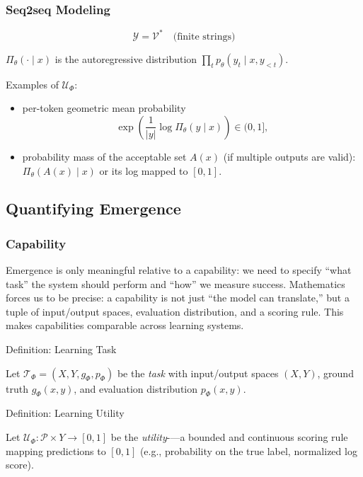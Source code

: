 \documentclass[12pt]{article}
\begin{document}
\subsubsection{Seq2seq Modeling}

\[
\mathcal Y=\mathcal V^{*} \quad \text{(finite strings)}
\]

$\Pi_\theta(\cdot\mid x)$ is the autoregressive distribution $\prod_t p_\theta(y_t\mid x,y_{<t})$.

Examples of $\mathcal U_\Phi$:
\begin{itemize}
    \item per-token geometric mean probability
    \[
    \exp\!\left(\frac{1}{|y|}\log \Pi_\theta(y\mid x)\right)\in(0,1],
    \]
    \item probability mass of the acceptable set $A(x)$ (if multiple outputs are valid): $\Pi_\theta(A(x)\mid x)$ or its log mapped to $[0,1]$.
\end{itemize}

\subsection{Quantifying Emergence}

\subsubsection{Capability}

Emergence is only meaningful relative to a capability: we need to specify “what task” the system should perform and “how” we measure success. Mathematics forces us to be precise: a capability is not just “the model can translate,” but a tuple of input/output spaces, evaluation distribution, and a scoring rule. This makes capabilities comparable across learning systems.

\begin{statementbox}{Definition: Learning Task}

Let $\mathcal T _\Phi=(X,Y,g_\Phi, p_\Phi)$ be the \textit{task} with input/output spaces $(X,Y)$, ground truth $g_\Phi(x,y)$, and evaluation distribution $p_\Phi(x,y)$. 

\end{statementbox}

\begin{statementbox}{Definition: Learning Utility}

Let $\mathcal U_\Phi : \mathcal P \times Y \to[0,1]$ be the \textit{utility}-—a bounded and continuous scoring rule mapping predictions to $[0,1]$ (e.g., probability on the true label, normalized log score).

\end{statementbox}
\end{document}
